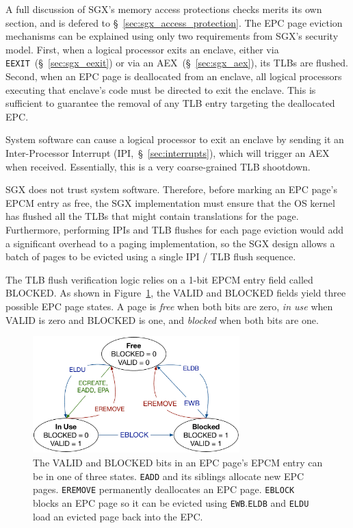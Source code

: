 A full discussion of SGX's memory access protections checks merits its own
section, and is defered to \S~\ref{sec:sgx_access_protection}. The EPC page
eviction mechanisms can be explained using only two requirements from SGX's
security model. First, when a logical processor exits an enclave, either via
\texttt{EEXIT}~(\S~\ref{sec:sgx_eexit}) or via an AEX~(\S~\ref{sec:sgx_aex}),
its TLBs are flushed. Second, when an EPC page is deallocated from an enclave,
all logical processors executing that enclave's code must be directed to exit
the enclave. This is sufficient to guarantee the removal of any TLB entry
targeting the deallocated EPC.

System software can cause a logical processor to exit an enclave by sending it
an Inter-Processor Interrupt (IPI,~\S~\ref{sec:interrupts}), which will trigger
an AEX when received. Essentially, this is a very coarse-grained TLB shootdown.

SGX does not trust system software. Therefore, before marking an EPC page's
EPCM entry as free, the SGX implementation must ensure that the OS kernel has
flushed all the TLBs that might contain translations for the page. Furthermore,
performing IPIs and TLB flushes for each page eviction would add a significant
overhead to a paging implementation, so the SGX design allows a batch of pages
to be evicted using a single IPI / TLB flush sequence.


The TLB flush verification logic relies on a 1-bit EPCM entry field called
BLOCKED. As shown in Figure~\ref{fig:sgx_page_states}, the VALID and BLOCKED
fields yield three possible EPC page states. A page is \textit{free} when both
bits are zero, \textit{in use} when VALID is zero and BLOCKED is one, and
\textit{blocked} when both bits are one.

\begin{figure}[hbt]
  \centering
  \includegraphics[width=80mm]{figures/sgx_page_states.pdf}
  \caption{
    The VALID and BLOCKED bits in an EPC page's EPCM entry can be in one of
    three states. \texttt{EADD} and its siblings allocate new EPC pages.
    \texttt{EREMOVE} permanently deallocates an EPC page. \texttt{EBLOCK}
    blocks an EPC page so it can be evicted using \texttt{EWB}.\texttt{ELDB}
    and \texttt{ELDU} load an evicted page back into the EPC.
  }
  \label{fig:sgx_page_states}
\end{figure}

